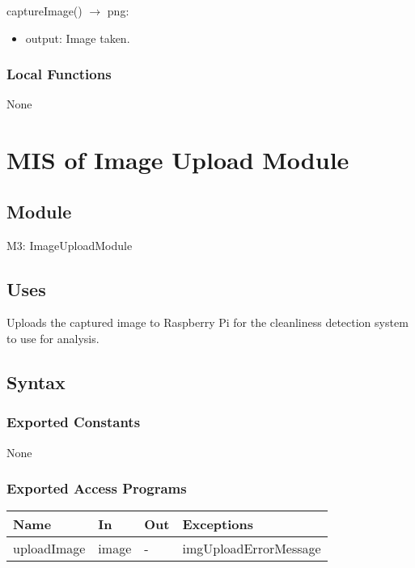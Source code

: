 \documentclass[12pt, titlepage]{article}
\begin{document}
\noindent captureImage() $\rightarrow$ png:
\begin{itemize}
\item output: Image taken.
\end{itemize}


\subsubsection{Local Functions}
None

\newpage


\section{MIS of Image Upload Module} \label{Module} 

\subsection{Module}

M3: ImageUploadModule

\subsection{Uses}
Uploads the captured image to Raspberry Pi for the cleanliness detection system to use for analysis.

\subsection{Syntax}

\subsubsection{Exported Constants}
None

\subsubsection{Exported Access Programs}

\begin{center}
\begin{tabular}{p{4cm} p{3cm} p{3cm} p{5cm}}
\hline
\textbf{Name} & \textbf{In} & \textbf{Out} & \textbf{Exceptions} \\
\hline
uploadImage & image & - & imgUploadErrorMessage \\
\hline
\end{tabular}
\end{center}
\end{document}
